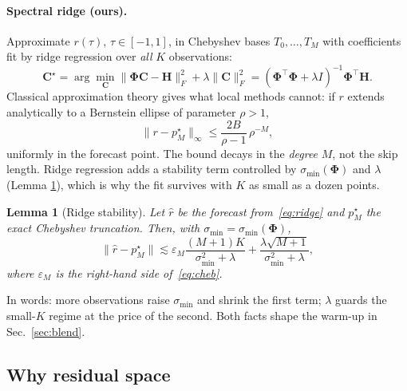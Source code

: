 \documentclass[10pt,twocolumn,letterpaper]{article}
\newtheorem{lemma}{Lemma}
\begin{document}
\paragraph{Spectral ridge (ours).}
Approximate $r(\tau)$, $\tau \in [-1,1]$, in Chebyshev bases
$T_0,\dots,T_M$ with coefficients fit by ridge regression over \emph{all}
$K$ observations:
\begin{equation}
  \mathbf{C}^\star = \arg\min_{\mathbf{C}}
  \|\mathbf{\Phi}\mathbf{C} - \mathbf{H}\|_F^2
  + \lambda\|\mathbf{C}\|_F^2
  = (\mathbf{\Phi}^\top\mathbf{\Phi} + \lambda I)^{-1}
    \mathbf{\Phi}^\top \mathbf{H}.
  \label{eq:ridge}
\end{equation}
Classical approximation theory gives what local methods cannot: if $r$
extends analytically to a Bernstein ellipse of parameter $\rho>1$,
\begin{equation}
  \|r - p_M^\star\|_\infty \le \frac{2B}{\rho-1}\,\rho^{-M},
  \label{eq:cheb}
\end{equation}
uniformly in the forecast point. The bound decays in the \emph{degree}
$M$, not the skip length. Ridge regression adds a stability term
controlled by $\sigma_{\min}(\mathbf{\Phi})$ and $\lambda$ (Lemma
\ref{lem:ridge}), which is why the fit survives with $K$ as small as a
dozen points.

\begin{lemma}[Ridge stability]
\label{lem:ridge}
Let $\hat{r}$ be the forecast from~\eqref{eq:ridge} and $p_M^\star$ the
exact Chebyshev truncation. Then, with
$\sigma_{\min} = \sigma_{\min}(\mathbf{\Phi})$,
\begin{equation}
  \|\hat{r} - p_M^\star\| \lesssim
  \varepsilon_M \frac{(M{+}1)K}{\sigma_{\min}^2 + \lambda}
  + \frac{\lambda\sqrt{M{+}1}}{\sigma_{\min}^2 + \lambda},
\end{equation}
where $\varepsilon_M$ is the right-hand side of~\eqref{eq:cheb}.
\end{lemma}
In words: more observations raise $\sigma_{\min}$ and shrink the first
term; $\lambda$ guards the small-$K$ regime at the price of the second.
Both facts shape the warm-up in Sec.~\ref{sec:blend}.

\subsection{Why residual space}
\label{sec:residual}
\end{document}
